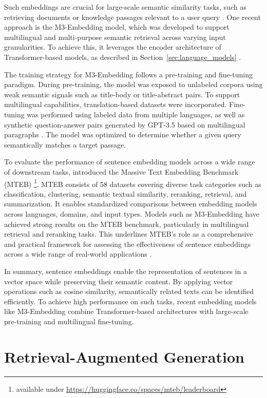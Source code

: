 \documentclass[a4paper,oneside,bibliography=totoc]{scrbook}
\begin{document}
Such embeddings are crucial for large-scale semantic similarity tasks, such as retrieving documents or knowledge passages relevant to a user query \cite{Reimers2019,Gao2024}. One recent approach is the M3-Embedding model, which was developed to support multilingual and multi-purpose semantic retrieval across varying input granularities. To achieve this, it leverages the encoder architecture of Transformer-based models, as described in Section~\ref{sec:language_models} \cite{Chen2024}.

The training strategy for M3-Embedding follows a pre-training and fine-tuning paradigm. During pre-training, the model was exposed to unlabeled corpora using weak semantic signals such as title-body or title-abstract pairs. To support multilingual capabilities, translation-based datasets were incorporated. Fine-tuning was performed using labeled data from multiple languages, as well as synthetic question-answer pairs generated by \ac{GPT}-3.5 based on multilingual paragraphs \cite{Chen2024}. The model was optimized to determine whether a given query semantically matches a target passage.

To evaluate the performance of sentence embedding models across a wide range of downstream tasks, \citet{Muennighoff2023} introduced the Massive Text Embedding Benchmark (MTEB) \footnote{available under \url{https://huggingface.co/spaces/mteb/leaderboard}}. MTEB consists of 58 datasets covering diverse task categories such as classification, clustering, semantic textual similarity, reranking, retrieval, and summarization. It enables standardized comparisons between embedding models across languages, domains, and input types. Models such as M3-Embedding have achieved strong results on the MTEB benchmark, particularly in multilingual retrieval and reranking tasks. This underlines MTEB’s role as a comprehensive and practical framework for assessing the effectiveness of sentence embeddings across a wide range of real-world applications \cite{Muennighoff2023}.

In summary, sentence embeddings enable the representation of sentences in a vector space while preserving their semantic content. By applying vector operations such as cosine similarity, semantically related texts can be identified efficiently. To achieve high performance on such tasks, recent embedding models like M3-Embedding combine Transformer-based architectures with large-scale pre-training and multilingual fine-tuning.


\section{Retrieval-Augmented Generation}
\label{sec:retrieval_augmented_generation}
\end{document}
